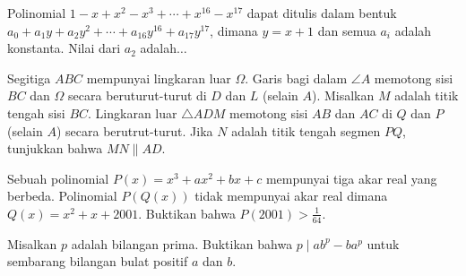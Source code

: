 \documentclass[11pt]{article}
\begin{document}
\begin{CJK*}{UTF8}{min}
\begin{soalbaru}
    \end{soalbaru}

	\begin{soalbaru}
	Polinomial $1-x+x^2-x^3+\cdots+x^{16}-x^{17}$ dapat ditulis dalam bentuk $a_0+a_1y+a_2y^2+\cdots +a_{16}y^{16}+a_{17}y^{17}$, dimana $y=x+1$ dan semua $a_i$ adalah konstanta. Nilai dari $a_2$ adalah$\dots$
	\end{soalbaru}
 
	\begin{soalbaru}
	Segitiga $ABC$ mempunyai lingkaran luar $\Omega$. Garis bagi dalam $\angle A$ memotong sisi $BC$ dan $\Omega$ secara beruturut-turut di $D$ dan $L$ (selain $A$). Misalkan $M$ adalah titik tengah sisi $BC$. Lingkaran luar $\triangle  ADM$ memotong sisi $AB$ dan $AC$ di $Q$ dan $P$ (selain $A$) secara berutrut-turut. Jika $N$ adalah titik tengah segmen $PQ$, tunjukkan bahwa $MN \parallel AD$. 
	\end{soalbaru}


    \begin{soalbaru}
		Sebuah polinomial $P(x)=x^3+ax^2+bx+c$ mempunyai tiga akar real yang berbeda. Polinomial $P(Q(x))$ tidak mempunyai akar real dimana $Q(x)=x^2+x+2001$. Buktikan bahwa $P(2001)>\frac{1}{64}$.
    \end{soalbaru}	

    \begin{soalbaru} 
    Misalkan $p$ adalah bilangan prima. Buktikan bahwa $p \mid ab^p - ba^p$ untuk sembarang bilangan bulat positif $a$ dan $b$.
\end{soalbaru}

\end{CJK*}
\end{document}
